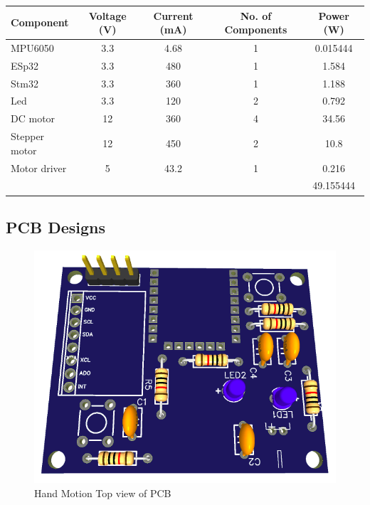 \begin{table}[H]
  \begin{center}
    \leavevmode
     \begin{tabular}{| l | c | c | c | c |}\hline
Component & Voltage (V) & Current (mA) & No. of Components & Power (W) \\\hline
MPU6050 & 3.3 & 4.68 & 1 & 0.015444 \\\hline
ESp32 & 3.3 & 480 & 1 & 1.584 \\\hline
Stm32 & 3.3 & 360 & 1 & 1.188 \\\hline
Led & 3.3 & 120 & 2 & 0.792 \\\hline
DC motor & 12 & 360 & 4 & 34.56 \\\hline
Stepper motor & 12 & 450 & 2 & 10.8 \\\hline
Motor driver & 5 & 43.2 & 1 & 0.216 \\\hline
& & & & 49.155444 \\\hline
    \end{tabular}
    \label{table:1}
  \end{center}
\end{table}

\subsection{PCB Designs}

\begin{figure}[H]
    \centering
    \includegraphics[scale=0.5]{Figures/HMpcb_top.png}
    \caption{Hand Motion Top view of PCB}
    \label{fig:handmotiontopview}
\end{figure}


